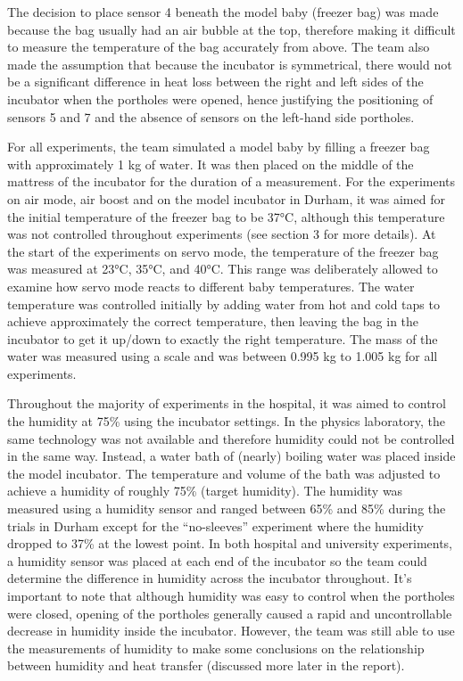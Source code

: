 \documentclass{article}
\begin{document}
The decision to place sensor 4 beneath the model baby (freezer bag) was made because the bag usually had an air bubble at the top, therefore making it difficult to measure the temperature of the bag accurately from above. The team also made the assumption that because the incubator is symmetrical, there would not be a significant difference in heat loss between the right and left sides of the incubator when the portholes were opened, hence justifying the positioning of sensors 5 and 7 and the absence of sensors on the left-hand side portholes.

\vspace{3mm}

For all experiments, the team simulated a model baby by filling a freezer bag with approximately 1 kg of water. It was then placed on the middle of the mattress of the incubator for the duration of a measurement. For the experiments on air mode, air boost and on the model incubator in Durham, it was aimed for the initial temperature of the freezer bag to be 37°C, although this temperature was not controlled throughout experiments (see section 3 for more details). At the start of the experiments on servo mode, the temperature of the freezer bag was measured at 23°C, 35°C, and 40°C. This range was deliberately allowed to examine how servo mode reacts to different baby temperatures. The water temperature was controlled initially by adding water from hot and cold taps to achieve approximately the correct temperature, then leaving the bag in the incubator to get it up/down to exactly the right temperature. The mass of the water was measured using a scale and was between 0.995 kg to 1.005 kg for all experiments.

\vspace{3mm}


Throughout the majority of experiments in the hospital, it was aimed to control the humidity at 75\% using the incubator settings. In the physics laboratory, the same technology was not available and therefore humidity could not be controlled in the same way. Instead, a water bath of (nearly) boiling water was placed inside the model incubator. The temperature and volume of the bath was adjusted to achieve a humidity of roughly 75\% (target humidity). The humidity was measured using a humidity sensor and ranged between 65\% and 85\% during the trials in Durham except for the “no-sleeves” experiment where the humidity dropped to 37\% at the lowest point. In both hospital and university experiments, a humidity sensor was placed at each end of the incubator so the team could determine the difference in humidity across the incubator throughout. It’s important to note that although humidity was easy to control when the portholes were closed, opening of the portholes generally caused a rapid and uncontrollable decrease in humidity inside the incubator. However, the team was still able to use the measurements of humidity to make some conclusions on the relationship between humidity and heat transfer (discussed more later in the report). 
\end{document}
